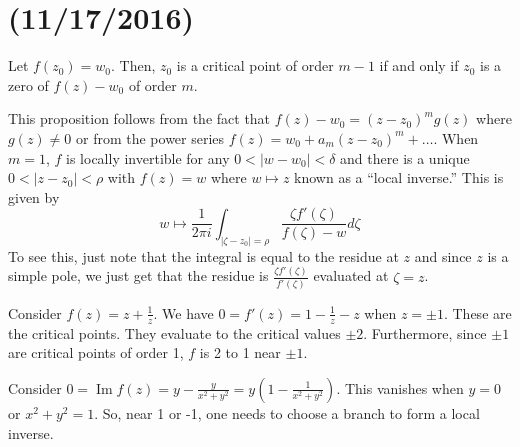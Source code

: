 \documentclass[11pt,leqno,oneside]{amsart}
\numberwithin{thm}{section}
\renewcommand{\Im}{\operatorname{Im}}
\begin{document}
  \section{(11/17/2016)}
  \begin{prop}
    Let $f(z_0) = w_0$. Then, $z_0$ is a critical point of order $m-1$
    if and only if $z_0$ is a zero of $f(z) - w_0$ of order $m$.
  \end{prop}
  This proposition follows from the fact that $f(z)-w_0 =
  (z-z_0)^mg(z)$ where $g(z) \neq 0$ or from the power series $f(z) =
  w_0 + a_m(z-z_0)^m + \ldots$. When $m=1$, $f$ is locally invertible
  for any $0 < |w-w_0| < \delta$ and there is a unique $0 < |z-z_0| <
  \rho$ with $f(z) = w$ where $w \mapsto z$ known as a ``local
  inverse.'' This is given by \[
    w \mapsto \frac{1}{2\pi i} \int_{|\zeta-z_0| = \rho} \frac{\zeta
      f'(\zeta)}{f(\zeta)-w}d\zeta
  \]
  To see this, just note that the integral is equal to the residue at
  $z$ and since $z$ is a simple pole, we just get that the residue is
  $\frac{\zeta f'(\zeta)}{f'(\zeta)}$ evaluated at $\zeta = z$.
  \begin{example}
    Consider $f(z) = z + \frac{1}{z}$. We have $0 = f'(z) = 1 -
    \frac{1}{z} - z$ when $z = \pm 1$. These are the critical
    points. They evaluate to the critical values $\pm 2$. Furthermore,
    since $\pm 1$ are critical points of order 1, $f$ is 2 to 1 near
    $\pm 1$.
  \end{example}
  \begin{example}
    Consider $0 = \Im f(z) = y - \frac{y}{x^2+y^2} =
    y(1-\frac{1}{x^2+y^2})$. This vanishes when $y = 0$ or $x^2+y^2 =
    1$. So, near 1 or -1, one needs to choose a branch to form a local
    inverse.
  \end{example}
\end{document}
